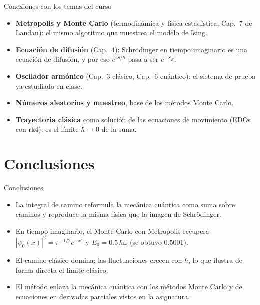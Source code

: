 \documentclass[aspectratio=169, 11pt]{beamer}
\begin{document}
\begin{frame}{Conexiones con los temas del curso}
  \small
  \begin{itemize}\setlength\itemsep{6pt}
    \item \textbf{Metropolis y Monte Carlo} (termodinámica y física estadística,
          Cap.~7 de Landau): el mismo algoritmo que muestrea el modelo de Ising.
    \item \textbf{Ecuación de difusión} (Cap.~4): Schrödinger en tiempo imaginario
          es una ecuación de difusión, y por eso $e^{iS/\hbar}$ pasa a ser $e^{-S_E}$.
    \item \textbf{Oscilador armónico} (Cap.~3 clásico, Cap.~6 cuántico): el sistema
          de prueba ya estudiado en clase.
    \item \textbf{Números aleatorios y muestreo}, base de los métodos Monte Carlo.
    \item \textbf{Trayectoria clásica} como solución de las ecuaciones de movimiento
          (EDOs con rk4): es el límite $\hbar \to 0$ de la suma.
  \end{itemize}
\end{frame}

\section{Conclusiones}

\begin{frame}{Conclusiones}
  \small
  \begin{itemize}\setlength\itemsep{6pt}
    \item La integral de camino reformula la mecánica cuántica como suma sobre
          caminos y reproduce la misma física que la imagen de Schrödinger.
    \item En tiempo imaginario, el Monte Carlo con Metropolis recupera
          $|\psi_0(x)|^2 = \pi^{-1/2} e^{-x^2}$ y $E_0 = 0.5\,\hbar\omega$ (se obtuvo $0.5001$).
    \item El camino clásico domina; las fluctuaciones crecen con $\hbar$, lo que
          ilustra de forma directa el límite clásico.
    \item El método enlaza la mecánica cuántica con los métodos Monte Carlo y de
          ecuaciones en derivadas parciales vistos en la asignatura.
  \end{itemize}
\end{frame}
\end{document}
